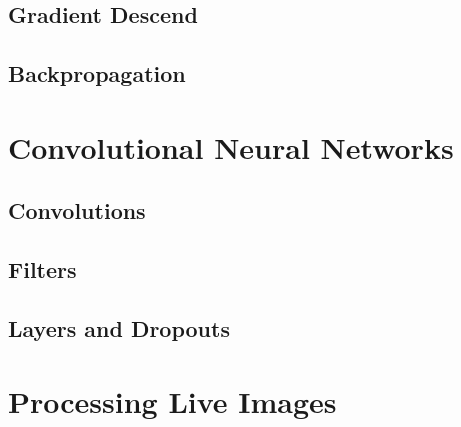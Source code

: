 \documentclass[a4paper,english]{report}
\begin{document}
        \section{Gradient Descend}
        \section{Backpropagation}        
        \chapter{Convolutional Neural Networks}
        \section{Convolutions}
        \section{Filters}
        \section{Layers and Dropouts}
        \chapter{Processing Live Images}
    
\end{document}
